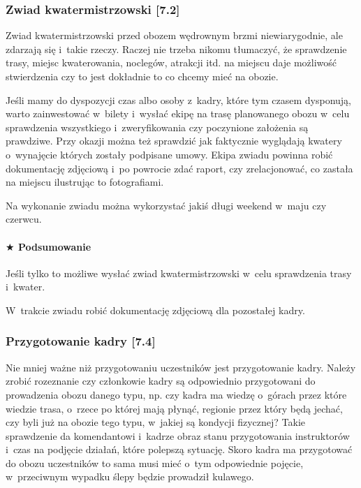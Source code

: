 \documentclass[a5paper,10pt,titlepage,twoside]{article}
\newcommand*{\thecheckbox}{\hss$\Box$} %
\newenvironment*{checklist}
{\list{}{%
\renewcommand*{\makelabel}[1]{\thecheckbox}}}
{\endlist}
\begin{document}
\subsubsection{Zwiad kwatermistrzowski [7.2]\label{zwiad-kwatermistrzowski}}
Zwiad kwatermistrzowski przed obozem wędrownym brzmi niewiarygodnie, ale zdarzają się i~takie rzeczy. Raczej nie trzeba nikomu tłumaczyć, że sprawdzenie trasy, miejsc kwaterowania, noclegów, atrakcji itd. na miejscu daje możliwość stwierdzenia czy to jest dokładnie to co chcemy mieć na obozie.

Jeśli mamy do dyspozycji czas albo osoby z~kadry, które tym czasem dysponują, warto zainwestować w~bilety i~wysłać ekipę na trasę planowanego obozu w~celu sprawdzenia wszystkiego i~zweryfikowania czy poczynione założenia są prawdziwe. Przy okazji można też sprawdzić jak faktycznie wyglądają kwatery o~wynajęcie których zostały podpisane umowy. Ekipa zwiadu powinna robić dokumentację zdjęciową i~po powrocie zdać raport, czy zrelacjonować, co zastała na miejscu ilustrując to fotografiami.

Na wykonanie zwiadu można wykorzystać jakiś długi weekend w~maju czy czerwcu.\newpage
\paragraph{$\bigstar$ Podsumowanie}
\begin{checklist}
\item Jeśli tylko to możliwe wysłać zwiad kwatermistrzowski w~celu sprawdzenia trasy i~kwater.
\item W~trakcie zwiadu robić dokumentację zdjęciową dla pozostałej kadry.
\end{checklist}

\subsubsection{Przygotowanie kadry [7.4]}
Nie mniej ważne niż przygotowaniu uczestników jest przygotowanie kadry. Należy zrobić rozeznanie czy członkowie kadry są odpowiednio przygotowani do prowadzenia obozu danego typu, np. czy kadra ma wiedzę o~górach przez które wiedzie trasa, o~rzece po której mają płynąć, regionie przez który będą jechać, czy byli już na obozie tego typu, w~jakiej są kondycji fizycznej? Takie sprawdzenie da komendantowi i~kadrze obraz stanu przygotowania instruktorów i~czas na podjęcie działań, które polepszą sytuację. Skoro kadra ma przygotować do obozu uczestników to sama musi mieć o~tym odpowiednie pojęcie, w~przeciwnym wypadku ślepy będzie prowadził kulawego.
\end{document}

